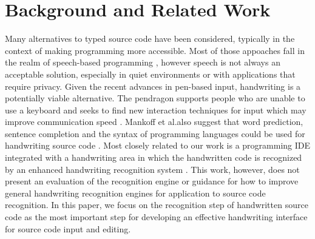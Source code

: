 \documentclass{vgtc}                          %
\begin{document}


\section{Background and Related Work}



Many alternatives to typed source code have been considered, typically in the context of making programming more accessible.   Most of those appoaches fall in the realm of speech-based programming \cite{desilets2006voicecode, gordon2013improving}, however speech is not always an acceptable solution, especially in quiet environments or with applications that require privacy.
Given the recent advances in pen-based input, handwriting is a potentially viable alternative.  The pendragon supports people who are unable to use
a keyboard and seeks to find new interaction techniques for input which may improve communication speed \cite{Pendragon}. Mankoff et al.also suggest that word prediction, sentence completion and the syntax of programming languages could be used for handwriting source code \cite{mankoff1998cirrin}. 
Most closely related to our work is a programming IDE integrated with a handwriting area in which the handwritten code is recognized by an enhanced handwriting recognition system \cite{frye2008pdp}.  This work, however, does not present an evaluation of the recognition engine or guidance for how to improve general handwriting recognition engines for application to source code recognition.
In this paper, we focus on the recognition step of handwritten source code as the most important step for developing an effective handwriting interface for source code input and editing.
\end{document}

